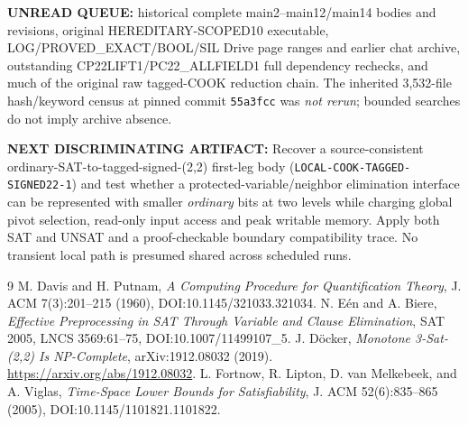 \documentclass[11pt]{article}
\begin{document}
\textbf{UNREAD QUEUE:} historical complete
main2--main12/main14 bodies and revisions, original
HEREDITARY-SCOPED10 executable, LOG/PROVED_EXACT/BOOL/SIL
Drive page ranges and earlier chat archive, outstanding
CP22LIFT1/PC22_ALLFIELD1 full dependency rechecks,
and much of the original raw tagged-COOK reduction chain.
The inherited 3,532-file hash/keyword census at pinned
commit \texttt{55a3fcc} was \emph{not rerun}; bounded
searches do not imply archive absence.

\textbf{NEXT DISCRIMINATING ARTIFACT:}
Recover a source-consistent ordinary-SAT-to-tagged-signed-(2,2)
first-leg body (\texttt{LOCAL-COOK-TAGGED-SIGNED22-1})
and test whether a protected-variable/neighbor elimination
interface can be represented with smaller \emph{ordinary}
bits at two levels while charging global pivot selection,
read-only input access and peak writable memory.
Apply both SAT and UNSAT and a proof-checkable boundary
compatibility trace. No transient local path is presumed
shared across scheduled runs.

\begin{thebibliography}{9}
 M. Davis and H. Putnam,
\emph{A Computing Procedure for Quantification Theory},
J. ACM 7(3):201--215 (1960), DOI:10.1145/321033.321034.
 N. E\'en and A. Biere,
\emph{Effective Preprocessing in SAT Through Variable and Clause Elimination},
SAT 2005, LNCS 3569:61--75, DOI:10.1007/11499107\_5.
 J. D\"ocker,
\emph{Monotone 3-Sat-(2,2) Is NP-Complete}, arXiv:1912.08032 (2019).
\url{https://arxiv.org/abs/1912.08032}.
 L. Fortnow, R. Lipton, D. van Melkebeek,
and A. Viglas, \emph{Time-Space Lower Bounds for Satisfiability},
J. ACM 52(6):835--865 (2005), DOI:10.1145/1101821.1101822.
\end{thebibliography}
\end{document}
